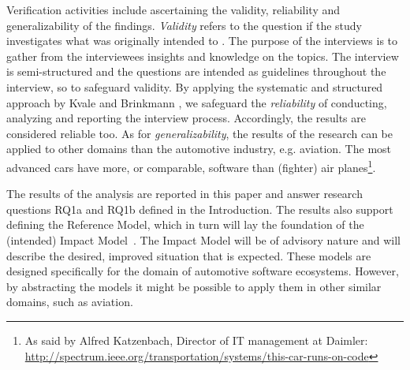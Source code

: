  Verification activities include ascertaining the validity, reliability and generalizability of the findings. {\em Validity} refers to the question if the study investigates what was originally intended to \cite{Kvale2015Interviews}. The purpose of the interviews is to gather from the interviewees insights and knowledge on the topics. The interview is semi-structured and the questions are intended as guidelines throughout the interview, so to safeguard validity. %
By applying the systematic and structured approach by Kvale and Brinkmann \cite{Kvale2015Interviews}, we safeguard the {\em reliability} of conducting, analyzing and reporting  the interview process. Accordingly, the results are considered reliable too. As for {\em generalizability}, the results of the research can be applied to other domains than the automotive industry, e.g. aviation. The most advanced cars have more, or comparable, software than (fighter) air planes\footnote{As said by Alfred Katzenbach, Director of IT management at Daimler: \url{http://spectrum.ieee.org/transportation/systems/this-car-runs-on-code}}.%

 The results of the analysis are reported in this paper and answer research questions RQ1a and RQ1b defined in the Introduction. The results also support defining the Reference Model, which in turn will lay the foundation of the (intended) Impact Model~\cite{Blessing:2009:DDR:1717807}. The Impact Model will be of advisory nature and will describe the desired, improved situation that is expected. These models are designed specifically for the domain of automotive software ecosystems. However, by abstracting the models it might be possible to apply them in other similar domains, such as aviation.

